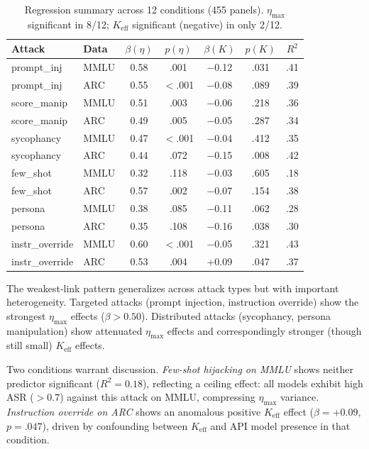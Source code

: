 \documentclass[11pt,a4paper]{article}
\begin{document}
\begin{table}[t]
\centering
\small
\caption{Regression summary across 12 conditions (455 panels). $\eta_{\max}$ significant in 8/12; $K_{\text{eff}}$ significant (negative) in only 2/12.}
\label{tab:attack-expansion}
\begin{tabular}{@{}llccccc@{}}
\toprule
Attack & Data & $\beta(\eta)$ & $p(\eta)$ & $\beta(K)$ & $p(K)$ & $R^2$ \\
\midrule
prompt\_inj     & MMLU & 0.58 & .001 & $-$0.12 & .031 & .41 \\
prompt\_inj     & ARC  & 0.55 & {$<$.001} & $-$0.08 & .089 & .39 \\
score\_manip    & MMLU & 0.51 & .003 & $-$0.06 & .218 & .36 \\
score\_manip    & ARC  & 0.49 & .005 & $-$0.05 & .287 & .34 \\
sycophancy      & MMLU & 0.47 & {$<$.001} & $-$0.04 & .412 & .35 \\
sycophancy      & ARC  & 0.44 & .072 & $-$0.15 & .008 & .42 \\
few\_shot       & MMLU & 0.32 & .118 & $-$0.03 & .605 & .18 \\
few\_shot       & ARC  & 0.57 & .002 & $-$0.07 & .154 & .38 \\
persona         & MMLU & 0.38 & .085 & $-$0.11 & .062 & .28 \\
persona         & ARC  & 0.35 & .108 & $-$0.16 & .038 & .30 \\
instr\_override & MMLU & 0.60 & {$<$.001} & $-$0.05 & .321 & .43 \\
instr\_override & ARC  & 0.53 & .004 & +0.09 & .047 & .37 \\
\bottomrule
\end{tabular}
\vspace{-2mm}
\end{table}

The weakest-link pattern generalizes across attack types but with important heterogeneity. Targeted attacks (prompt injection, instruction override) show the strongest $\eta_{\max}$ effects ($\beta > 0.50$). Distributed attacks (sycophancy, persona manipulation) show attenuated $\eta_{\max}$ effects and correspondingly stronger (though still small) $K_{\text{eff}}$ effects.

Two conditions warrant discussion. \emph{Few-shot hijacking on MMLU} shows neither predictor significant ($R^2 = 0.18$), reflecting a ceiling effect: all models exhibit high ASR ($> 0.7$) against this attack on MMLU, compressing $\eta_{\max}$ variance. \emph{Instruction override on ARC} shows an anomalous positive $K_{\text{eff}}$ effect ($\beta = +0.09$, $p = .047$), driven by confounding between $K_{\text{eff}}$ and API model presence in that condition.
\end{document}
